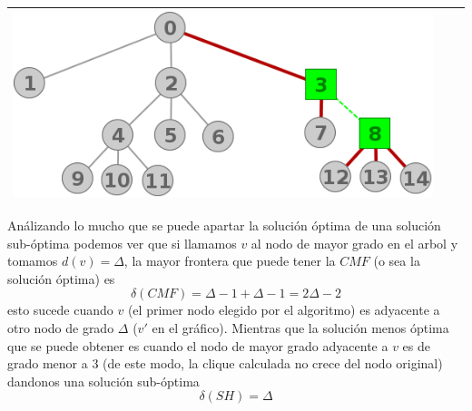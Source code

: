 \begin{center}
\begin{tabular}{ |c||c||c| }
			\includegraphics[scale = 0.3]{img/ej3/constructiva_golosa/tree_st12.png} \\
			\hline
		\end{tabular}
	\end{center}

An\'alizando lo mucho que se puede apartar la soluci\'on \'optima de una soluci\'on sub-\'optima
podemos ver que si llamamos $v$ al nodo de mayor grado en el arbol y tomamos $d(v) = \Delta$, la
mayor frontera que puede tener la $CMF$ (o sea la soluci\'on \'optima) es
\[ \delta(CMF) = \Delta -1 + \Delta -1 = 2 \Delta -2 \]
esto sucede cuando $v$ (el primer nodo elegido por el algoritmo) es adyacente a otro nodo de grado
$\Delta$ ($v'$ en el gr\'afico). Mientras que la soluci\'on menos \'optima que se puede obtener es 
cuando el nodo de mayor grado adyacente a $v$ es de grado menor a 3 
(de este modo, la clique calculada no crece del nodo original) dandonos una soluci\'on sub-\'optima
\[ \delta(SH) = \Delta \]

